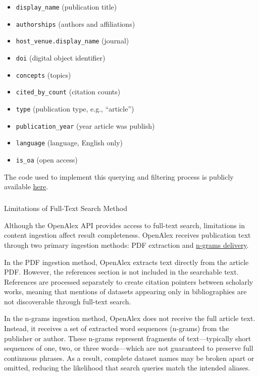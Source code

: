 \documentclass[
  letterpaper,
  DIV=11,
  numbers=noendperiod]{scrartcl}
\makeatletter
\let\oldsubparagraph\subparagraph
\renewcommand{\subparagraph}{
    \@ifstar
      \xxxSubParagraphStar
      \xxxSubParagraphNoStar
  }
\newcommand{\xxxSubParagraphStar}[1]{\oldsubparagraph*{#1}\mbox{}}
\newcommand{\xxxSubParagraphNoStar}[1]{\oldsubparagraph{#1}\mbox{}}
\providecommand{\tightlist}{%
  \setlength{\itemsep}{0pt}\setlength{\parskip}{0pt}}\usepackage{longtable,booktabs,array}
\makeatother
\begin{document}
\begin{itemize}
\tightlist
\item
  \texttt{display\_name} (publication title)
\item
  \texttt{authorships} (authors and affiliations)
\item
  \texttt{host\_venue.display\_name} (journal)
\item
  \texttt{doi} (digital object identifier)
\item
  \texttt{concepts} (topics)
\item
  \texttt{cited\_by\_count} (citation counts)
\item
  \texttt{type} (publication type, e.g., ``article'')
\item
  \texttt{publication\_year} (year article was publish)
\item
  \texttt{language} (language, English only)
\item
  \texttt{is\_oa} (open access)
\end{itemize}

The code used to implement this querying and filtering process is
publicly available
\href{https://laurenchenarides.github.io/compare_scopus_openalex_report/appendix.html}{here}.

\subparagraph{Limitations of Full-Text Search
Method}\label{limitations-of-full-text-search-method}

Although the OpenAlex API provides access to full-text search,
limitations in content ingestion affect result completeness. OpenAlex
receives publication text through two primary ingestion methods: PDF
extraction and
\href{https://docs.openalex.org/api-entities/works/get-n-grams}{n-grams
delivery}.

In the PDF ingestion method, OpenAlex extracts text directly from the
article PDF. However, the references section is not included in the
searchable text. References are processed separately to create citation
pointers between scholarly works, meaning that mentions of datasets
appearing only in bibliographies are not discoverable through full-text
search.

In the n-grams ingestion method, OpenAlex does not receive the full
article text. Instead, it receives a set of extracted word sequences
(n-grams) from the publisher or author. These n-grams represent
fragments of text---typically short sequences of one, two, or three
words---which are not guaranteed to preserve full continuous phrases. As
a result, complete dataset names may be broken apart or omitted,
reducing the likelihood that search queries match the intended aliases.
\end{document}
